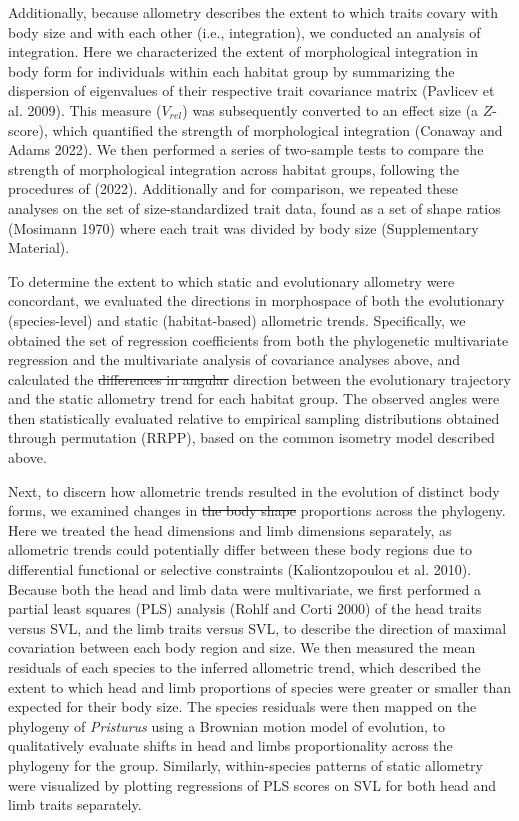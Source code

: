 \documentclass[
  11pt,
]{article}
\providecommand{\DIFaddtex}[1]{{\protect\color{blue}\uwave{#1}}} %
\providecommand{\DIFdeltex}[1]{{\protect\color{red}\sout{#1}}}                      %
\providecommand{\DIFaddbegin}{} %
\providecommand{\DIFaddend}{} %
\providecommand{\DIFdelbegin}{} %
\providecommand{\DIFdelend}{} %
\providecommand{\DIFadd}[1]{\texorpdfstring{\DIFaddtex{#1}}{#1}} %
\providecommand{\DIFdel}[1]{\texorpdfstring{\DIFdeltex{#1}}{}} %
\newcommand{\DIFscaledelfig}{0.5}
\newlength{\DIFdelgraphicswidth} %
\newlength{\DIFdelgraphicsheight} %
\newcommand{\DIFaddincludegraphics}[2][]{{\color{blue}\fbox{\DIFOincludegraphics[#1]{#2}}}} %
\newcommand{\DIFdelincludegraphics}[2][]{%
\sbox{\DIFdelgraphicsbox}{\DIFOincludegraphics[#1]{#2}}%
\settoboxwidth{\DIFdelgraphicswidth}{\DIFdelgraphicsbox} %
\settoboxtotalheight{\DIFdelgraphicsheight}{\DIFdelgraphicsbox} %
\scalebox{\DIFscaledelfig}{%
\parbox[b]{\DIFdelgraphicswidth}{\usebox{\DIFdelgraphicsbox}\\[-\baselineskip] \rule{\DIFdelgraphicswidth}{0em}}\llap{\resizebox{\DIFdelgraphicswidth}{\DIFdelgraphicsheight}{%
\setlength{\unitlength}{\DIFdelgraphicswidth}%
\begin{picture}(1,1)%
\thicklines\linethickness{2pt} %
{\color[rgb]{1,0,0}\put(0,0){\framebox(1,1){}}}%
{\color[rgb]{1,0,0}\put(0,0){\line( 1,1){1}}}%
{\color[rgb]{1,0,0}\put(0,1){\line(1,-1){1}}}%
\end{picture}%
}\hspace*{3pt}}} %
} %
\DeclareRobustCommand{\DIFaddbegin}{\DIFOaddbegin \let\includegraphics\DIFaddincludegraphics} %
\DeclareRobustCommand{\DIFaddend}{\DIFOaddend \let\includegraphics\DIFOincludegraphics} %
\DeclareRobustCommand{\DIFdelbegin}{\DIFOdelbegin \let\includegraphics\DIFdelincludegraphics} %
\DeclareRobustCommand{\DIFdelend}{\DIFOaddend \let\includegraphics\DIFOincludegraphics} %
\begin{document}
Additionally, because allometry describes the extent to which traits
covary with body size and with each other (i.e., integration), we
conducted an analysis of integration. Here we characterized the extent
of morphological integration in body form for individuals within each
habitat group by summarizing the dispersion of eigenvalues of their
respective trait covariance matrix (Pavlicev et al. 2009). This measure
(\(V_{rel}\)) was subsequently converted to an effect size (a
\(Z\)-score), which quantified the strength of morphological integration
(Conaway and Adams 2022). We then performed a series of two-sample tests
to compare the strength of morphological integration across habitat
groups, following the procedures of (2022). Additionally and for
comparison, we repeated these analyses on the set of size-standardized
trait data, found as a set of shape ratios (Mosimann 1970) where each
trait was divided by body size (Supplementary Material). \hfill\break

To determine the extent to which static and evolutionary allometry were
concordant, we evaluated the directions in morphospace of both the
evolutionary (species-level) and static (habitat-based) allometric
trends. Specifically, we obtained the set of regression coefficients
from both the phylogenetic multivariate regression and the multivariate
analysis of covariance analyses above, and calculated the \DIFdelbegin \DIFdel{differences in
angular
}\DIFdelend \DIFaddbegin \DIFadd{angular
difference in their }\DIFaddend direction between the evolutionary trajectory and
the static allometry trend for each habitat group. The observed angles
were then statistically evaluated relative to empirical sampling
distributions obtained through permutation (RRPP), based on the common
isometry model described above. \hfill\break

Next, to discern how allometric trends resulted in the evolution of
distinct body forms, we examined changes in \DIFdelbegin \DIFdel{the body shape }\DIFdelend \DIFaddbegin \DIFadd{relative body }\DIFaddend proportions
across the phylogeny. Here we treated the head dimensions and limb
dimensions separately, as allometric trends could potentially differ
between these body regions due to differential functional or selective
constraints (Kaliontzopoulou et al. 2010). Because both the head and
limb data were multivariate, we first performed a partial least squares
(PLS) analysis (Rohlf and Corti 2000) of the head traits versus SVL, and
the limb traits versus SVL, to describe the direction of maximal
covariation between each body region and size. We then measured the mean
residuals of each species to the inferred allometric trend, which
described the extent to which head and limb proportions of species were
greater or smaller than expected for their body size. The species
residuals were then mapped on the phylogeny of \emph{Pristurus} using a
Brownian motion model of evolution, to qualitatively evaluate shifts in
head and limbs proportionality across the phylogeny for the group.
Similarly, within-species patterns of static allometry were visualized
by plotting regressions of PLS scores on SVL for both head and limb
traits separately. \hfill\break
\end{document}
